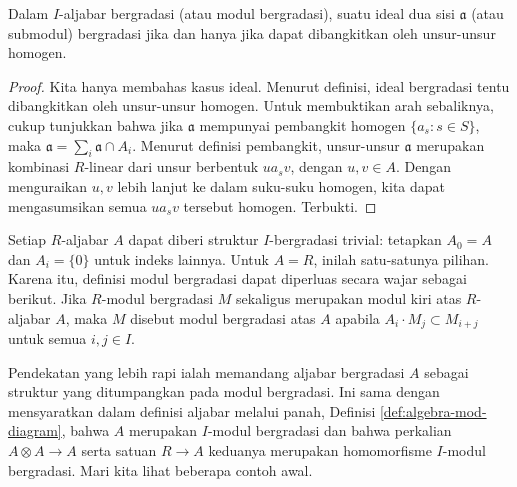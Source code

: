 \begin{lemma}\label{prop:graded-ideal-submodule}
	Dalam $I$-aljabar bergradasi (atau modul bergradasi), suatu ideal dua sisi $\mathfrak{a}$ (atau submodul) bergradasi jika dan hanya jika dapat dibangkitkan oleh unsur-unsur homogen.
\end{lemma}
\begin{proof}
	Kita hanya membahas kasus ideal. Menurut definisi, ideal bergradasi tentu dibangkitkan oleh unsur-unsur homogen. Untuk membuktikan arah sebaliknya, cukup tunjukkan bahwa jika $\mathfrak{a}$ mempunyai pembangkit homogen $\{a_s : s \in S \}$, maka $\mathfrak{a} = \sum_i \mathfrak{a} \cap A_i$. Menurut definisi pembangkit, unsur-unsur $\mathfrak{a}$ merupakan kombinasi $R$-linear dari unsur berbentuk $u a_s v$, dengan $u,v \in A$. Dengan menguraikan $u, v$ lebih lanjut ke dalam suku-suku homogen, kita dapat mengasumsikan semua $u a_s v$ tersebut homogen. Terbukti.
\end{proof}

Setiap $R$-aljabar $A$ dapat diberi struktur $I$-bergradasi trivial: tetapkan $A_0 = A$ dan $A_i = \{0\}$ untuk indeks lainnya. Untuk $A = R$, inilah satu-satunya pilihan. Karena itu, definisi modul bergradasi dapat diperluas secara wajar sebagai berikut. Jika $R$-modul bergradasi $M$ sekaligus merupakan modul kiri atas $R$-aljabar $A$, maka $M$ disebut modul bergradasi atas $A$ apabila $A_i \cdot M_j \subset M_{i+j}$ untuk semua $i,j \in I$.

Pendekatan yang lebih rapi ialah memandang aljabar bergradasi $A$ sebagai struktur yang ditumpangkan pada modul bergradasi. Ini sama dengan mensyaratkan dalam definisi aljabar melalui panah, Definisi \ref{def:algebra-mod-diagram}, bahwa $A$ merupakan $I$-modul bergradasi dan bahwa perkalian $A \otimes A \to A$ serta satuan $R \to A$ keduanya merupakan homomorfisme $I$-modul bergradasi. Mari kita lihat beberapa contoh awal.

